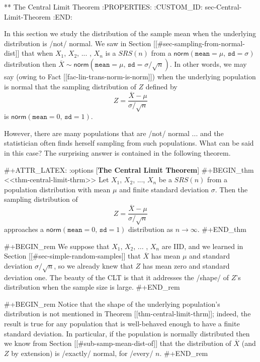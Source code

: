 ** The Central Limit Theorem
:PROPERTIES:
:CUSTOM_ID: sec-Central-Limit-Theorem
:END:

In this section we study the distribution of the sample mean when the
underlying distribution is /not/ normal. We saw in Section [[#sec-sampling-from-normal-dist]] that when \(X_{1}\), \(X_{2}\), ... , \(X_{n}\) is a
\(SRS(n)\) from a
\(\mathsf{norm}(\mathtt{mean}=\mu,\,\mathtt{sd}=\sigma)\) distribution
then \(\overline{X} \sim \mathsf{norm}(\mathtt{mean} =
\mu,\,\mathtt{sd} = \sigma/\sqrt{n})\). In other words, we may say
(owing to Fact [[fac-lin-trans-norm-is-norm]]) when the underlying
population is normal that the sampling distribution of \(Z\) defined
by
\begin{equation}
Z=\frac{\overline{X}-\mu}{\sigma/\sqrt{n}}
\end{equation}
is \(\mathsf{norm}(\mathtt{mean}=0,\,\mathtt{sd}=1)\). 

However, there are many populations that are /not/ normal ... and the
statistician often finds herself sampling from such populations. What
can be said in this case? The surprising answer is contained in the
following theorem.

#+ATTR_LATEX: :options [\textbf{The Central Limit Theorem}]
#+BEGIN_thm
<<thm-central-limit-thrm>> Let \(X_{1}\), \(X_{2}\), ..., \(X_{n}\) be
a \(SRS(n)\) from a population distribution with mean \(\mu\) and
finite standard deviation \(\sigma\). Then the sampling distribution
of
\begin{equation}
Z=\frac{\overline{X}-\mu}{\sigma/\sqrt{n}}
\end{equation}
approaches a \(\mathsf{norm}(\mathtt{mean}=0,\,\mathtt{sd}=1)\) distribution as \(n\to\infty\).
#+END_thm

#+BEGIN_rem
We suppose that \(X_{1}\), \(X_{2}\), ... , \(X_{n}\) are IID, and we
learned in Section [[#sec-simple-random-samples]] that \(\overline{X}\) has
mean \(\mu\) and standard deviation \(\sigma/\sqrt{n}\), so we already
knew that \(Z\) has mean zero and standard deviation one. The beauty
of the CLT is that it addresses the /shape/ of \(Z\)'s distribution
when the sample size is large.
#+END_rem

#+BEGIN_rem
Notice that the shape of the underlying population's distribution is
not mentioned in Theorem [[thm-central-limit-thrm]]; indeed, the result is true for any
population that is well-behaved enough to have a finite standard
deviation. In particular, if the population is normally distributed
then we know from Section [[#sub-samp-mean-dist-of]] that the distribution
of \(\overline{X}\) (and \(Z\) by extension) is /exactly/ normal, for
/every/ \(n\).
#+END_rem

